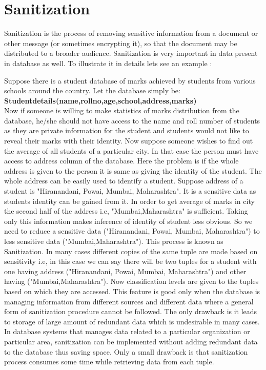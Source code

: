 \documentclass[11pt,a4paper]{report}
\begin{document}
\section{Sanitization}
Sanitization is the process of removing sensitive information from a document or other message (or sometimes encrypting it), so that the document may be distributed to a broader audience. Sanitization is very important in data present in database as well. To illustrate it in details lets see an example : 

Suppose there is a student database of marks achieved by students from various schools around the country. Let the database simply be:\\
\textbf{Student\textunderscore details(name,roll\textunderscore no,age,school,address,marks)}\\
Now if someone is willing to make statistics of marks distribution from the database, he/she should not have access to the name and roll number of students  as they are private information for the student and students would not like to reveal their marks with their identity. Now suppose someone wishes to find out the average of all students of a particular city. In that case the person must have access to address column of the database. Here the problem is if the whole address is given to the person it is same as giving the identity of the student. The whole address can be easily used to identify a student. Suppose address of a student is "Hiranandani, Powai, Mumbai, Maharashtra". It is a sensitive data as students identity can be gained from it. In order to get average of marks in city the second half of the address i.e, "Mumbai,Maharashtra" is sufficient. Taking only this information makes inference of identity of student less obvious. So we need to reduce a sensitive data ("Hiranandani, Powai, Mumbai, Maharashtra") to less sensitive data ("Mumbai,Maharashtra"). This process is known as Sanitization. In many cases different copies of the same tuple are made based on sensitivity i.e, in this case we can say there will be two tuples for a student with one having address ("Hiranandani, Powai, Mumbai, Maharashtra") and other having ("Mumbai,Maharashtra"). Now classification levels are given to the tuples based on which they are accessed. This feature is good only when the database is managing information from different sources and different data where a general form of sanitization procedure cannot be followed. The only drawback is it leads to storage of large amount of redundant data which is undesirable in many cases. 
In database systems that manages data related to a particular organization or particular area, sanitization can be implemented without adding redundant data to the database thus saving space. Only a small drawback is that sanitization process consumes some time while retrieving data from each tuple. 
\end{document}
